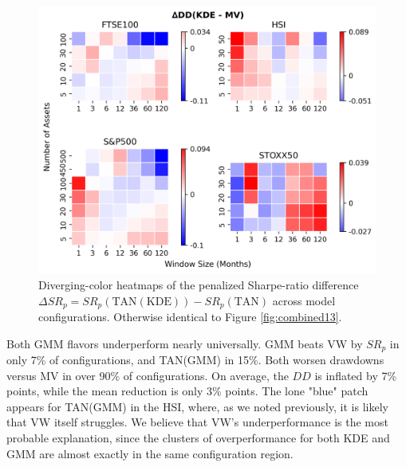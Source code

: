 \begin{figure}[H]
  \begin{center}
  \begin{minipage}{1\textwidth}
    \centering
    \includegraphics[width=\textwidth]{images/40_17.png}
  \end{minipage}
  \caption[Heatmap 4]{Diverging-color heatmaps of the penalized Sharpe-ratio difference $\Delta SR_p = SR_p(\mathrm{TAN(KDE)}) - SR_p(\mathrm{TAN})$ across model configurations. Otherwise identical to Figure \ref{fig:combined13}.}
  \label{fig:combined16}
  \end{center}
  \end{figure}

Both GMM flavors underperform nearly universally. GMM beats VW by $SR_{p}$ in only 7\% of configurations, and TAN(GMM) in 15\%. Both worsen drawdowns versus MV in over 90\% of configurations. On average, the $DD$ is inflated by 7\% points, while the mean reduction is only 3\% points. The lone "blue" patch appears for TAN(GMM) in the HSI, where, as we noted previously, it is likely that VW itself struggles. We believe that VW's underperformance is the most probable explanation, since the clusters of overperformance for both KDE and GMM are almost exactly in the same configuration region.


